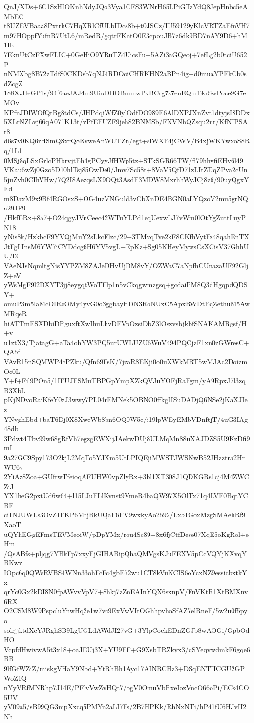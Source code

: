 QnJ/XDs+6C1SzHIOKnhNdyJQo3Vya1CFS3WNrH65LPiGTzYdQ8JepHnbc5eAMbEC
t8UZEVBaaa8PxtrhC7HqXRlCfULbIDcs8b+t0JSCz/IU59129yKlcVRTZaEfnVH7
m97HOppfYufnR7UtL6/mRedR/gqtrFKntO0E3cpouJB7z6dk9BD7nAY9D6+hM1Ib
7EknUtCzFXwFLIC+0GeHiO9YRuTZ4UicsFu+5AZi3aGQeoj+7efLg2b0tciU652P
nNMXbg8B72zTdfS0CKDsb7qNJ4RDOoiCHRKHN2aBPn4ig+d0muaYPFkCb0sdZcgZ
188XzHeGP1s/94f6aeJAJ4m9UiuDBOBmmwPvBCrg7s7enEQmEkrSwPoce9G7eMOv
KPfnJDlWOfQtBg8tdCs/JHPdqiWfZ0ylOdfDO989E6AlDXPJXnZvt1dtyjsI8DDx
5XLrNZLvj66qA071K13t/vPfEFUZF9jeh82BNMSb/FNVNhQZsqu2nr/KfNIPSAr8
d6s7v0KQ6rHSmQSxrQ8KvweAnWUTZn/egt+slWXE4jCWV/B4xjWKYwxoS8Rq/1L1
0MSj8qLSxGrlcPHbrvjtEh4gPCyyJfHWp5tz+STkSGR66TW/fl79hhvfiEHv6l49
VKau6wZj0Gzo5D10hlTsj85OwDe0/Jmv7Sc58t+8VaV5QfD71zLItZDqZPva2cUn
5juZvh0CIhVHw/7Q2I8AezqsLX9OQt3AsdF3MDW8MxrhhWyJCj8z6/90uyQgxYEd
m8DaxM9x9Bf4RGOsxS+OG4uzVNGuld3vCbXnDE4BGN0aLYQzoV2mu5grNQa29JF9
/HkfERx+8a7+O24qgyJVnCeec42WTuYLPd1eqUexwLJ7vWm0lOtYgZuttLuyPN18
yNis8k/HzkbcF9YVQjMuY2sLkcFlzc/29+3TMvqTve2kF8CKfhVytFz48qahEnTX
JtFgLInsM6YW7iCYDdcg6H6YV5vgL+EpKz+Sg05KHeyMywsCsXCisV37GhhUU/l3
VAeNJsNqmltgNisYYPZM8ZAJeDHvUjDM8vY/OZWaC7aNpfhCUnazaUF92GljZ+eV
yWsMgF9l2DXYT3jj8eygqtWoTFlp1n5vCkqgwmzgsq+gcdaiPM8Q3dHgqpdQDSY+
omuP3m5laMcOIRcOMy4yvG0o3ggbayHDN3RoNUxO5ApxRWDtEqZethuM5AwMRqeR
hiATTmESXDbiDRguxftXwIhuLhvDFVpOzsiDbZ3lOszvsbjkbfSNAKAMRgsf/H+v
u1ztX3/TjatagG+aTa4ohYW3PQ5urUWLUZU6WuV494PQCjzF1xn0zGWresC+QA5f
VAvR15nSQMWP4cPZku/Qfn69FsK/7jzaR8EKji0o0uXWkMRT5wMJAc2DoizmOc0L
Y+f+Fil9POn5/1IFUJFSMuTBPGpYmpXZkQVJuYOFjRaFgm/yA9RpxJ7l3zqB3XbL
pKjNDvoRaiKfeY0zJ3wwy7PL04rEMNek5OBNO0ffkgIISuDADjQ6NSe2jKaXJIez
YNvghEbd+baT6Dj0X8XweWb8bn6OQ0W5e/i19lpWEyEMbVDnftjT/4uG3IAg48db
3Pdwt4Tbv99w68gRfVh7egzgEWXijJAekwDUj8ULMqMn88uXAJDZS5U9KzDfi9mI
9a27GC9Spy173O2kjL2MqTo5YJXm5UtLPIQEjiMWSTJWSNwB52JHzztra2HrWU6v
2YiAz8Zoa+GUftwTfeioqAFUHW0vpZlyRx+3bl1XT308J1QDKGRs1cj4M4ZWCZiJ
YX1heG2pxtUd6w64+l15LJuFLlKvnst9VmeR4baQW97X5OlTx71q4LVF0BqtYCBF
ci1NJUWLs3OvZ1FKP6MtjBkUQaF6FV9wxkyAo2592/Lx51GoxMzgSMAehRf9XaoT
uQYhEGgEFmsTEVMeoiW/pDpYMx/rou4Sc89+8x6fjCtfDese07XqE5oKgRol+eHm
/QsABfs+pljqg7YBkFp7xxyFjGIHABipQhaQMVgsKJuFEXV5pCcVQYjKXvqYBKwv
IOpc6q0QWsRVBS4WNn33ohFcFc4gbE72wu1CT8kVuKCIS6oYcxNZ9essicbxtkYx
qrYc0Gx2kDI8N0fpAWvvVpV7+8hkj7zZnEAInYQX6sxnpV/FnVKtR1XtBMXnv6RX
O2CSM8W9PspcluYnwHq2e1w7vc9ExVwVItOGhhpvhoSfAZ7elRneF/5w2u0f5pyo
solrjjktdXcYJRghSB9LgUGLdAWdJI27vG+3YlpCoekEDnZGJb8wAOGi/GpbOdHO
VcpfdHwivwA5t3x18+oaJEUj3X+YU9FF+G9XsbTRZkyx3/qSYeqvwdmkF6gqe6BB
9lfGfWZiZ/miskgVHaY9Nbd+YtRhBh1Ayc17AINRCHz3+DSqENTIICGU2GPWoZ1Q
nYyVRfMNRhp7J14E/PFlvVwZvHQt7/ogV0OmuVbRxeIozVncO66oPi/ECs4CO5UV
yV09a5/sB99QG3mpXxcq5PMYn2aLI7Fs/2B7HPKk/RhNxNTi/hP41fU6HJvII2Nh
